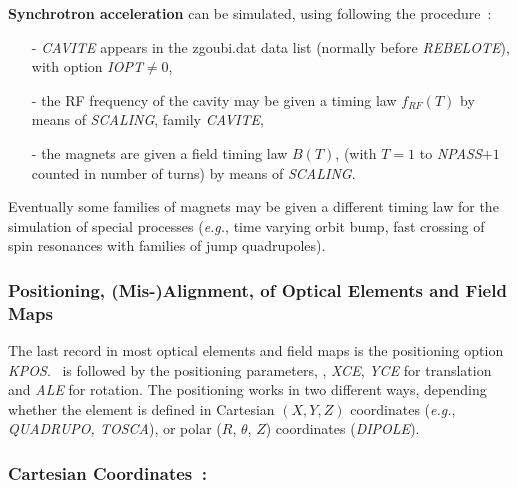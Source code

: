 \noindent\textbf{Synchrotron acceleration} can be simulated, using following the procedure~: 
\begin{itemize}
\item[-] \textsl{CAVITE} appears in the zgoubi.dat data list (normally before
\textsl{REBELOTE}), with option \textsl{IOPT}$\neq 0$, 

\item[-] the RF frequency of the cavity may be given a timing law $f_{RF}(T)$ by 
means of \textsl{SCALING}, family \textsl{CAVITE}, 

\item[-] the magnets are given a field  timing law $ B(T)$,  
(with $T=1 $ to \textsl{NPASS}$+1$  counted in number of turns) by means of \textsl{SCALING}. \par
\end{itemize}

\noindent Eventually some families of magnets may be given a different timing law 
    for the simulation of special processes (\emph{e.g.}, time varying orbit bump, 
fast crossing of spin resonances with families of jump quadrupoles). 





\subsubsection{Positioning, (Mis-)Alignment, of Optical Elements and Field Maps} \label{sec4.6.2} 
  

The last record in most optical elements and field maps is the positioning option 
\textsl{KPOS}. \KPOS\ is followed by the positioning parameters, 
\eg, \textsl{XCE}, \textsl{YCE} 
for translation and \textsl{ALE} for rotation. The positioning works in two different ways, 
depending  whether the element is  defined in 
Cartesian $ (X, Y, Z) $ coordinates (\emph{e.g.}, \textsl{QUADRUPO, TOSCA}),
 or polar 
 ($R$, $\theta$, $Z$)  coordinates (\textsl{DIPOLE}). 
 
 \subsubsection*{Cartesian Coordinates~: }    
 
